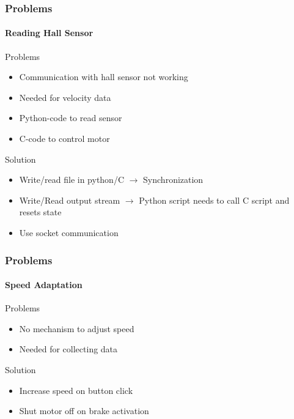 \documentclass[8pt]{beamer}
\begin{document}
\begin{frame}
	\frametitle{Problems}
	\framesubtitle{Reading Hall Sensor}
	\begin{block}{Problems}
	\begin{itemize}
		\item Communication with hall sensor not working
		\item Needed for velocity data
		\item Python-code to read sensor
		\item C-code to control motor
	\end{itemize}		
	\end{block}
	\pause
	\begin{block}{Solution}
		\begin{itemize}[<+->]
			\item Write/read file in python/C $\rightarrow$ Synchronization
			\item Write/Read output stream $\rightarrow$ Python script needs to call C script and resets state
			\item Use socket communication
		\end{itemize}
	\end{block}
\end{frame}

\begin{frame}
	\frametitle{Problems}
	\framesubtitle{Speed Adaptation}
	\begin{block}{Problems}
		\begin{itemize}
			\item No mechanism to adjust speed
			\item Needed for collecting data
		\end{itemize}
	\end{block}
	\pause
	\begin{block}{Solution}
		\begin{itemize}[<+->]
			\item Increase speed on button click
			\item Shut motor off on brake activation
		\end{itemize}
	\end{block}	
\end{frame}
\end{document}
